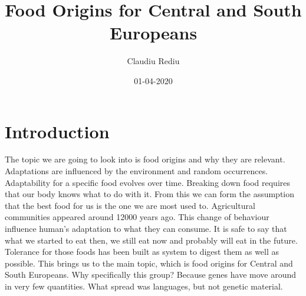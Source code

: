\documentclass{article}
\title{\Huge Food Origins for Central and South Europeans}
\date{01-04-2020}
\author{Claudiu Rediu}
\begin{document}
	\maketitle
	\newpage
	\newpage
	\section{Introduction}
	The topic we are going to look into is food origins and why they are relevant. Adaptations are influenced by the environment and random occurrences. Adaptability for a specific food evolves over time. Breaking down food requires that our body knows what to do with it. From this we can form the assumption that the best food for us is the one we are most used to. \newline
	Agricultural communities appeared around 12000 years ago. This change of behaviour influence human's adaptation to what they can consume. It is safe to say that what we started to eat then, we still eat now and probably will eat in the future. Tolerance for those foods has been built as system to digest them as well as possible.\newline
	This brings us to the main topic, which is food origins for Central and South Europeans. Why specifically this group? Because genes have move around in very few quantities. What spread was languages, but not genetic material.  
\end{document}
